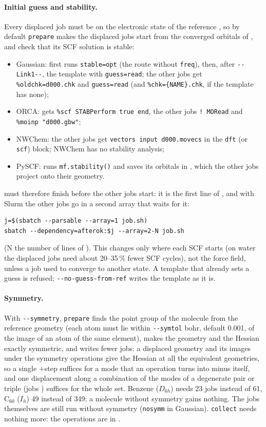 \paragraph{Initial guess and stability.} Every displaced job must be on
the electronic state of the reference , so by default
\texttt{prepare} makes the displaced jobs start from the converged orbitals
of , and  check that its SCF solution is stable:
\begin{itemize}
\item Gaussian:  first runs \texttt{stable=opt} (the route
  without \texttt{freq}), then, after \texttt{-{}-Link1-{}-}, the template
  with \texttt{guess=read}; the other jobs get \texttt{\%oldchk=d000.chk}
  and \texttt{guess=read} (and \texttt{\%chk=\{NAME\}.chk}, if the template
  has none);
\item ORCA:  gets \texttt{\%scf STABPerform true end}, the other
  jobs \texttt{! MORead} and \texttt{\%moinp "d000.gbw"};
\item NWChem: the other jobs get \texttt{vectors input d000.movecs} in the
  \texttt{dft} (or \texttt{scf}) block; NWChem has no stability analysis;
\item PySCF:  runs \texttt{mf.stability()} and saves its orbitals
  in , which the other jobs project onto their geometry.
\end{itemize}
 must therefore finish before the other jobs start: it is the
first line of , and with Slurm the other jobs go in a second
array that waits for it:
\begin{lstlisting}
j=$(sbatch --parsable --array=1 job.sh)
sbatch --dependency=afterok:$j --array=2-N job.sh
\end{lstlisting}
(N the number of lines of ). This changes only where each
SCF starts (on water the displaced jobs need about 20--35\,\% fewer SCF
cycles), not the force field, unless a job used to converge to another
state. A template that already sets a guess is refused;
\texttt{-{}-no-guess-from-ref} writes the template as it is.

\paragraph{Symmetry.} With \texttt{-{}-symmetry}, \texttt{prepare} finds
the point group of the molecule from the reference geometry (each atom
must lie within \texttt{-{}-symtol} bohr, default 0.001, of the image of
an atom of the same element), makes the geometry and the Hessian exactly
symmetric, and writes fewer jobs: a displaced geometry and its images
under the symmetry operations give the Hessian at all the equivalent
geometries, so a single $+$step suffices for a mode that an operation
turns into minus itself, and one displacement along a combination of the
modes of a degenerate pair or triple (jobs ) suffices for
the whole set. Benzene ($D_{6h}$) needs 23 jobs instead of 61, C$_{60}$
($I_h$) 49 instead of 349; a molecule without symmetry gains nothing.
The jobs themselves are still run without symmetry (\texttt{nosymm} in
Gaussian). \texttt{collect} needs nothing more: the operations are in
.

